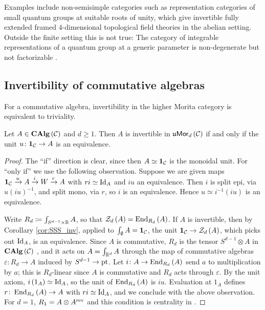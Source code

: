 Examples include non-semisimple categories such as representation categories of small
quantum groups at suitable roots of unity, which give invertible fully extended framed
$4$-dimensional topological field theories in the abelian setting. Outside the finite setting this is not true:
The category of integrable representations of a quantum group at a generic
parameter is non-degenerate but not factorizable \cite[Remark 1.7]{BJSS}.

\subsection{Invertibility of commutative algebras}
\label{sec:inv_comm}

For a commutative algebra, invertibility in the higher Morita category is equivalent to
triviality.

\begin{prop}
\label{prop:inv_symm}
Let $A\in\mathbf{CAlg}\left(\mathcal{C}\right)$ and $d\geq 1$.
Then $A$ is invertible in $\mathfrak{u}\mathsf{Mor}_d\left(\mathcal{C}\right)$ if and only if the unit
$u\colon\mathbf{1}_{\mathcal{C}}\to A$ is an equivalence.
\end{prop}

\begin{proof}
The ``if'' direction is clear, since then $A\simeq\mathbf{1}_{\mathcal{C}}$ is the monoidal unit.
For ``only if'' we use the following observation.
Suppose we are given maps
$\mathbf{1}_{\mathcal{C}}\xrightarrow{u}A\xrightarrow{i}W\xrightarrow{r}A$
with $ri\simeq\operatorname{Id}_A$ and $iu$ an equivalence.
Then $i$ is split epi, via $u\left(iu\right)^{-1}$, and split mono, via $r$, so $i$ is an
equivalence.
Hence $u\simeq i^{-1}\left(iu\right)$ is an equivalence.

Write $R_d\coloneqq\int_{S^{d-1}\times\mathbb{R}}A$, so that
$\mathcal{Z}_d\left(A\right)=\operatorname{End}_{R_d}\left(A\right)$.
If $A$ is invertible, then by Corollary \ref{cor:SSS_inv}, applied to $\int_{\emptyset}A=\mathbf{1}_{\mathcal{C}}$, the unit
$\mathbf{1}_{\mathcal{C}}\to\mathcal{Z}_d\left(A\right)$, which picks out $\operatorname{Id}_A$, is an equivalence.
Since $A$ is commutative, $R_d$ is the tensor $S^{d-1}\otimes A$ in $\mathbf{CAlg}\left(\mathcal{C}\right)$
\cite[Section 5.5]{L:HA}, and it acts on $A=\int_{\mathbb{R}^d}A$ through the map of commutative
algebras $\varepsilon\colon R_d\to A$ induced by $S^{d-1}\to\text{pt}$.
Let $i\colon A\to\operatorname{End}_{R_d}\left(A\right)$ send $a$ to multiplication by $a$; this is $R_d$-linear
since $A$ is commutative and $R_d$ acts through $\varepsilon$.
By the unit axiom, $i\left(1_A\right)\simeq\operatorname{Id}_A$, so the unit of $\operatorname{End}_{R_d}\left(A\right)$ is $iu$.
Evaluation at $1_A$ defines $r\colon\operatorname{End}_{R_d}\left(A\right)\to A$ with $ri\simeq\operatorname{Id}_A$, and we
conclude with the above observation.
For $d=1$, $R_1=A\otimes A^{\text{rev}}$ and this condition is centrality in \cite[Theorem 1.3]{BJSS}.
\end{proof}

